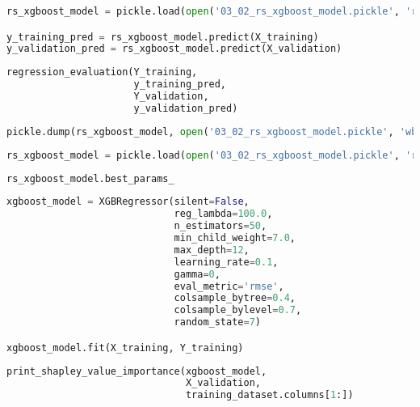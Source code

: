 \begin{lstlisting}[language=Python]
rs_xgboost_model = pickle.load(open('03_02_rs_xgboost_model.pickle', 'rb'))

y_training_pred = rs_xgboost_model.predict(X_training)
y_validation_pred = rs_xgboost_model.predict(X_validation)
\end{lstlisting}

\begin{lstlisting}[language=Python]
regression_evaluation(Y_training,
                      y_training_pred,
                      Y_validation,
                      y_validation_pred)
\end{lstlisting}

\begin{lstlisting}[language=Python]
pickle.dump(rs_xgboost_model, open('03_02_rs_xgboost_model.pickle', 'wb'))
\end{lstlisting}

\begin{lstlisting}[language=Python]
rs_xgboost_model = pickle.load(open('03_02_rs_xgboost_model.pickle', 'rb'))
\end{lstlisting}

\begin{lstlisting}[language=Python]
rs_xgboost_model.best_params_
\end{lstlisting}

\begin{lstlisting}[language=Python]
xgboost_model = XGBRegressor(silent=False,
                             reg_lambda=100.0,
                             n_estimators=50,
                             min_child_weight=7.0,
                             max_depth=12,
                             learning_rate=0.1,
                             gamma=0,
                             eval_metric='rmse',
                             colsample_bytree=0.4,
                             colsample_bylevel=0.7,
                             random_state=7)

xgboost_model.fit(X_training, Y_training)
\end{lstlisting}

\begin{lstlisting}[language=Python]
print_shapley_value_importance(xgboost_model,
                               X_validation,
                               training_dataset.columns[1:])
\end{lstlisting}
